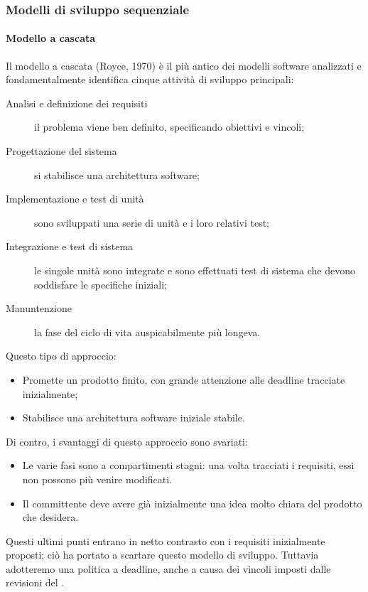 		\subsubsection{Modelli di sviluppo sequenziale}

			\paragraph{Modello a cascata}

			Il modello a cascata (Royce, 1970) è il più antico dei modelli software analizzati e fondamentalmente identifica cinque attività di sviluppo principali:
			
\begin{description}
\item [Analisi e definizione dei requisiti] il problema viene ben definito, specificando obiettivi e vincoli;
\item [Progettazione del sistema] si stabilisce una architettura software;
\item [Implementazione e test di unità] sono sviluppati una serie di unità e i loro relativi test;
\item [Integrazione e test di sistema] le singole unità sono integrate e sono effettuati test di sistema che devono soddisfare le specifiche iniziali;
\item [Manuntenzione] la fase del ciclo di vita auspicabilmente più longeva.
\end{description}
			
			Questo tipo di approccio:
\begin{itemize}
\item Promette un prodotto finito, con grande attenzione alle deadline tracciate inizialmente;
\item Stabilisce una architettura software iniziale stabile.
\end{itemize}

			Di contro, i svantaggi di questo approccio sono svariati:
\begin{itemize}
\item Le varie fasi sono a compartimenti stagni: una volta tracciati i requisiti, essi non possono più venire modificati.
\item Il committente deve avere già inizialmente una idea molto chiara del prodotto che desidera. 
\end{itemize}

Questi ultimi punti entrano in netto contrasto con i requisiti inizialmente proposti; ciò ha portato a scartare questo modello di sviluppo. Tuttavia adotteremo una politica a deadline, anche a causa dei vincoli imposti dalle revisioni del {\TV}.


